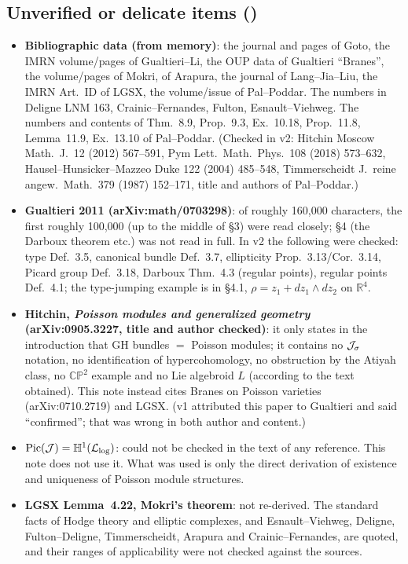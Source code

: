 \subsection{Unverified or delicate items (\tQ)}
\begin{itemize}
\item \textbf{Bibliographic data (from memory)}: the journal and pages of Goto, the IMRN volume/pages of Gualtieri--Li, the OUP data of Gualtieri ``Branes'', the volume/pages of Mokri, of Arapura, the journal of Lang--Jia--Liu, the IMRN Art.\ ID of LGSX, the volume/issue of Pal--Poddar. The numbers in Deligne LNM 163, Crainic--Fernandes, Fulton, Esnault--Viehweg. The numbers and contents of Thm.~8.9, Prop.~9.3, Ex.~10.18, Prop.~11.8, Lemma~11.9, Ex.~13.10 of Pal--Poddar. (Checked in v2: Hitchin Moscow Math.\ J.\ 12 (2012) 567--591, Pym Lett.\ Math.\ Phys.\ 108 (2018) 573--632, Hausel--Hunsicker--Mazzeo Duke 122 (2004) 485--548, Timmerscheidt J.\ reine angew.\ Math.\ 379 (1987) 152--171, title and authors of Pal--Poddar.)
\item \textbf{Gualtieri 2011 (arXiv:math/0703298)}: of roughly 160,000 characters, the first roughly 100,000 (up to the middle of \S3) were read closely; \S4 (the Darboux theorem etc.) was not read in full. In v2 the following were checked: type Def.~3.5, canonical bundle Def.~3.7, ellipticity Prop.~3.13/Cor.~3.14, Picard group Def.~3.18, Darboux Thm.~4.3 (regular points), regular points Def.~4.1; the type-jumping example is in \S4.1, $\rho=z_1+dz_1\wedge dz_2$ on $\mathbb R^4$.
\item \textbf{Hitchin, \emph{Poisson modules and generalized geometry} (arXiv:0905.3227, title and author checked)}: it only states in the introduction that GH bundles $=$ Poisson modules; it contains no $\mathcal J_\sigma$ notation, no identification of hypercohomology, no obstruction by the Atiyah class, no $\mathbb{CP}^2$ example and no Lie algebroid $L$ (according to the text obtained). This note instead cites Branes on Poisson varieties (arXiv:0710.2719) and LGSX. (v1 attributed this paper to Gualtieri and said ``confirmed''; that was wrong in both author and content.)
\item \textbf{$\mathrm{Pic}(\mathcal J)=\mathbb H^1(\mathcal L_{\log})$}: could not be checked in the text of any reference. This note does not use it. What was used is only the direct derivation of existence and uniqueness of Poisson module structures.
\item \textbf{LGSX Lemma~4.22, Mokri's theorem}: not re-derived. The standard facts of Hodge theory and elliptic complexes, and Esnault--Viehweg, Deligne, Fulton--Deligne, Timmerscheidt, Arapura and Crainic--Fernandes, are quoted, and their ranges of applicability were not checked against the sources.

\end{itemize}
